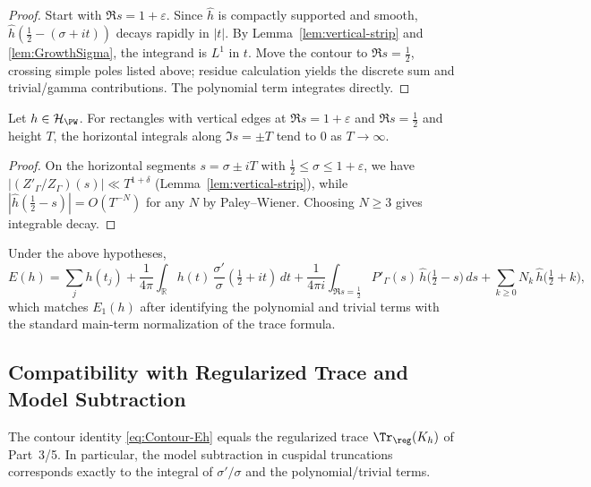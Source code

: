 \begin{proof}
Start with \(\Re s=1+\varepsilon\). Since \(\widehat h\) is compactly supported and smooth, \(\widehat h(\tfrac12-(\sigma+it))\) decays rapidly in \(|t|\). By Lemma~\ref{lem:vertical-strip} and \ref{lem:GrowthSigma}, the integrand is \(L^1\) in \(t\). Move the contour to \(\Re s=\tfrac12\), crossing simple poles listed above; residue calculation yields the discrete sum and trivial/gamma contributions. The polynomial term integrates directly. %
\end{proof}

\begin{lemma} \label{lem:HorizontalTails} %
Let \(h\in\mathcal H_{\PW}\). For rectangles with vertical edges at \(\Re s=1+\varepsilon\) and \(\Re s=\tfrac12\) and height \(T\), the horizontal integrals along \(\Im s=\pm T\) tend to \(0\) as \(T\to\infty\). %
\end{lemma}

\begin{proof}
On the horizontal segments \(s=\sigma\pm iT\) with \(\tfrac12\le\sigma\le 1+\varepsilon\), we have
\(|(Z'_\Gamma/Z_\Gamma)(s)|\ll T^{1+\delta}\) (Lemma~\ref{lem:vertical-strip}), while
\(|\widehat h(\tfrac12-s)|=O(T^{-N})\) for any \(N\) by Paley–Wiener. Choosing \(N\ge3\) gives integrable decay. %
\end{proof}

\begin{corollary} \label{cor:LockedContour} %
Under the above hypotheses,
\[
  E(h)
  = \sum_{j} h(t_j)
    + \frac{1}{4\pi}\int_{\mathbb R}h(t)\,\frac{\sigma'}{\sigma}(\tfrac12+it)\,dt
    + \frac{1}{4\pi i}\int_{\Re s=\tfrac12} P'_\Gamma(s)\,\widehat h\!\Big(\tfrac12-s\Big)\,ds
    + \sum_{k\ge0}N_k\,\widehat h\!\big(\tfrac12+k\big),
\]
which matches \(E_1(h)\) after identifying the polynomial and trivial terms with the standard main-term normalization of the trace formula. %
\end{corollary}

\subsection{Compatibility with Regularized Trace and Model Subtraction} \label{subsec:compat-regularization} %

\begin{proposition} \label{prop:TraceConsistency} %
The contour identity \eqref{eq:Contour-Eh} equals the regularized trace \(\Tr_{\reg}(K_h)\) of Part~3/5. In particular, the model subtraction in cuspidal truncations corresponds exactly to the integral of \(\sigma'/\sigma\) and the polynomial/trivial terms. %
\end{proposition}

